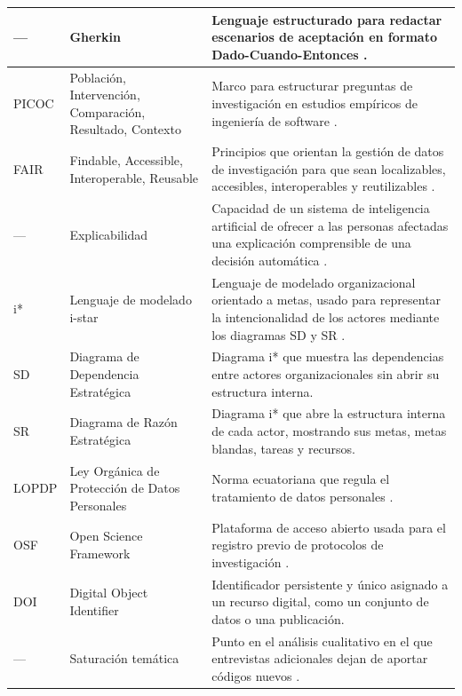 \documentclass[journal,onecolumn]{IEEEtran}
\begin{document}
\begin{longtable}{|p{2.2cm}|p{3.3cm}|p{9.5cm}|}
		--- & Gherkin & Lenguaje estructurado para redactar escenarios de aceptación en formato Dado-Cuando-Entonces \cite{fischbach2023}. \\ \hline
		
		PICOC & Población, Intervención, Comparación, Resultado, Contexto & Marco para estructurar preguntas de investigación en estudios empíricos de ingeniería de software \cite{kitchenham2007}. \\ \hline
		
		FAIR & Findable, Accessible, Interoperable, Reusable & Principios que orientan la gestión de datos de investigación para que sean localizables, accesibles, interoperables y reutilizables \cite{wilkinson2016}. \\ \hline
		
		--- & Explicabilidad & Capacidad de un sistema de inteligencia artificial de ofrecer a las personas afectadas una explicación comprensible de una decisión automática \cite{chazette2020}. \\ \hline
		
		i* & Lenguaje de modelado i-star & Lenguaje de modelado organizacional orientado a metas, usado para representar la intencionalidad de los actores mediante los diagramas SD y SR \cite{yu1995}. \\ \hline
		
		SD & Diagrama de Dependencia Estratégica & Diagrama i* que muestra las dependencias entre actores organizacionales sin abrir su estructura interna. \\ \hline
		
		SR & Diagrama de Razón Estratégica & Diagrama i* que abre la estructura interna de cada actor, mostrando sus metas, metas blandas, tareas y recursos. \\ \hline
		
		LOPDP & Ley Orgánica de Protección de Datos Personales & Norma ecuatoriana que regula el tratamiento de datos personales \cite{lopdp2021}. \\ \hline
		
		OSF & Open Science Framework & Plataforma de acceso abierto usada para el registro previo de protocolos de investigación \cite{nosek2018}. \\ \hline
		
		DOI & Digital Object Identifier & Identificador persistente y único asignado a un recurso digital, como un conjunto de datos o una publicación. \\ \hline
		
		--- & Saturación temática & Punto en el análisis cualitativo en el que entrevistas adicionales dejan de aportar códigos nuevos \cite{hennink2017}. \\ \hline
		

\end{longtable}
\end{document}
